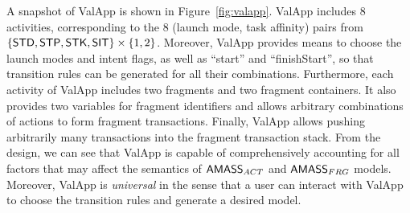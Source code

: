A snapshot of ValApp is shown in Figure~\ref{fig:valapp}. ValApp includes 8 activities, corresponding to the $8$ (launch mode, task affinity) pairs from $\{{\sf STD}, {\sf STP}, {\sf STK}, {\sf SIT}\} \times \{1,2\}$. Moreover, ValApp provides means to choose the launch modes and intent flags, as well as ``start'' and ``finishStart'', so that transition rules can be generated for all their combinations. 
Furthermore, each activity of ValApp includes two fragments and two fragment containers. It also provides two variables for fragment identifiers and allows arbitrary combinations of actions to form fragment transactions. Finally, ValApp allows pushing arbitrarily many transactions into the fragment transaction stack. 
%
From the design, we can see that ValApp is capable of comprehensively accounting for all factors that may affect the semantics of $\textsf{AMASS}_{ACT}$ and $\textsf{AMASS}_{FRG}$ models. Moreover, ValApp is \emph{universal} in the sense that a user can interact with ValApp to choose the transition rules and generate a desired {\AMASS} model. 



